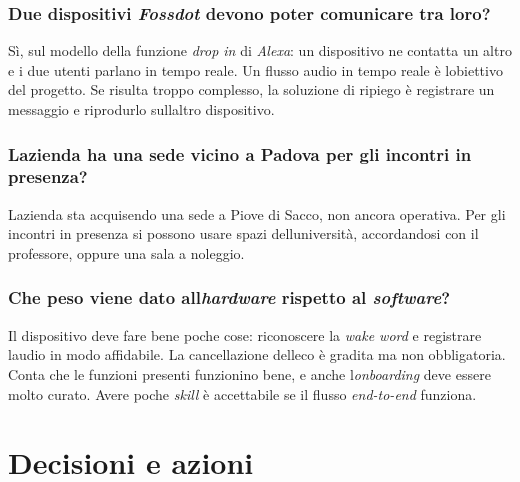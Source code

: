 \documentclass[12pt,a4paper]{article}
\begin{document}
\hypertarget{due-dispositivi-fossdot-devono-poter-comunicare-tra-loro}{%
\subsubsection{\texorpdfstring{Due dispositivi \emph{Fossdot} devono poter comunicare tra loro?}{Due dispositivi Fossdot devono poter comunicare tra loro?}}}

Sì, sul modello della funzione \emph{drop in} di \emph{Alexa}: un dispositivo ne contatta un altro e i due utenti parlano in tempo reale. Un flusso audio in tempo reale è l\textquotesingle obiettivo del progetto. Se risulta troppo complesso, la soluzione di ripiego è registrare un messaggio e riprodurlo sull\textquotesingle altro dispositivo.

\hypertarget{lazienda-ha-una-sede-vicino-a-padova-per-gli-incontri-in-presenza}{%
\subsubsection{L\textquotesingle azienda ha una sede vicino a Padova per gli incontri in presenza?}}

L\textquotesingle azienda sta acquisendo una sede a Piove di Sacco, non ancora operativa. Per gli incontri in presenza si possono usare spazi dell\textquotesingle università, accordandosi con il professore, oppure una sala a noleggio.

\hypertarget{che-peso-viene-dato-allhardware-rispetto-al-software}{%
\subsubsection{\texorpdfstring{Che peso viene dato all\textquotesingle{}\emph{hardware} rispetto al \emph{software}?}{Che peso viene dato all\textquotesingle hardware rispetto al software?}}}

Il dispositivo deve fare bene poche cose: riconoscere la \emph{wake word} e registrare l\textquotesingle audio in modo affidabile. La cancellazione dell\textquotesingle eco è gradita ma non obbligatoria. Conta che le funzioni presenti funzionino bene, e anche l\textquotesingle{}\emph{onboarding} deve essere molto curato. Avere poche \emph{skill} è accettabile se il flusso \emph{end-to-end} funziona.


\hypertarget{decisioni-e-azioni}{%
\section{Decisioni e azioni}}
\end{document}
